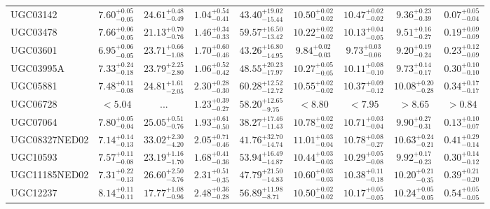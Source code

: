 \documentclass[onecolumn]{mn2e}
\begin{document}
{\begin{center}
\begin{longtable}{lcccccccc}
UGC03142 & $7.60_{-0.05}^{+0.05}$ & $24.61_{-0.49}^{+0.48}$ & $1.04_{-0.41}^{+0.54}$ &$43.40_{-15.44}^{+19.02}$ & $10.50_{-0.02}^{+0.02}$ & $10.47_{-0.02}^{+0.02}$ & $9.36_{-0.39}^{+0.23}$ & $0.07_{-0.04}^{+0.05}$ \\
UGC03478 & $7.66_{-0.05}^{+0.06}$ & $21.13_{-0.76}^{+0.70}$ & $1.46_{-0.33}^{+0.34}$ &$59.57_{-13.42}^{+16.50}$ & $10.22_{-0.02}^{+0.02}$ & $10.13_{-0.05}^{+0.04}$ & $9.51_{-0.27}^{+0.16}$ & $0.19_{-0.09}^{+0.09}$ \\
UGC03601 & $6.95_{-0.05}^{+0.06}$ & $23.71_{-1.08}^{+0.66}$ & $1.70_{-0.46}^{+0.60}$ &$43.26_{-14.95}^{+16.80}$ & $9.84_{-0.03}^{+0.02}$ & $9.73_{-0.06}^{+0.03}$ & $9.20_{-0.24}^{+0.19}$ & $0.23_{-0.09}^{+0.12}$ \\
UGC03995A & $7.33_{-0.18}^{+0.24}$ & $23.79_{-2.80}^{+2.25}$ & $1.06_{-0.42}^{+0.52}$ &$48.55_{-17.97}^{+20.23}$ & $10.27_{-0.05}^{+0.05}$ & $10.11_{-0.10}^{+0.08}$ & $9.73_{-0.17}^{+0.14}$ & $0.30_{-0.10}^{+0.10}$ \\
UGC05881 & $7.48_{-0.08}^{+0.11}$ & $24.81_{-2.05}^{+1.61}$ & $2.30_{-0.30}^{+0.28}$ &$60.28_{-12.72}^{+12.52}$ & $10.55_{-0.02}^{+0.02}$ & $10.37_{-0.12}^{+0.09}$ & $10.08_{-0.28}^{+0.20}$ & $0.34_{-0.17}^{+0.17}$ \\
UGC06728 & $<5.04$ & ... & $1.23_{-0.27}^{+0.39}$ &$58.20_{-9.75}^{+12.65}$ & $<8.80$ & $<7.95$ & $>8.65$ & $>0.84$ \\
UGC07064 & $7.80_{-0.04}^{+0.05}$ & $25.05_{-0.76}^{+0.51}$ & $1.93_{-0.50}^{+0.61}$ &$38.27_{-11.43}^{+17.46}$ & $10.78_{-0.02}^{+0.02}$ & $10.71_{-0.04}^{+0.03}$ & $9.90_{-0.31}^{+0.27}$ & $0.13_{-0.07}^{+0.10}$ \\
UGC08327NED02 & $7.14_{-0.13}^{+0.14}$ & $33.02_{-4.20}^{+2.30}$ & $2.05_{-0.46}^{+0.71}$ &$41.76_{-14.74}^{+32.70}$ & $11.01_{-0.04}^{+0.03}$ & $10.78_{-0.27}^{+0.08}$ & $10.63_{-0.21}^{+0.24}$ & $0.41_{-0.14}^{+0.29}$ \\
UGC10593 & $7.57_{-0.08}^{+0.11}$ & $23.19_{-1.70}^{+1.16}$ & $1.68_{-0.36}^{+0.41}$ &$53.94_{-14.87}^{+16.49}$ & $10.44_{-0.03}^{+0.03}$ & $10.29_{-0.08}^{+0.05}$ & $9.92_{-0.23}^{+0.17}$ & $0.30_{-0.12}^{+0.14}$ \\
UGC11185NED02 & $7.31_{-0.13}^{+0.22}$ & $26.60_{-3.76}^{+2.50}$ & $2.31_{-0.35}^{+0.51}$ &$47.79_{-14.83}^{+21.50}$ & $10.60_{-0.03}^{+0.03}$ & $10.38_{-0.18}^{+0.11}$ & $10.20_{-0.35}^{+0.21}$ & $0.39_{-0.20}^{+0.21}$ \\
UGC12237 & $8.14_{-0.11}^{+0.11}$ & $17.77_{-0.96}^{+1.08}$ & $2.48_{-0.28}^{+0.36}$ &$56.89_{-8.71}^{+11.98}$ & $10.50_{-0.02}^{+0.02}$ & $10.17_{-0.05}^{+0.05}$ & $10.24_{-0.05}^{+0.05}$ & $0.54_{-0.05}^{+0.05}$ \\

\end{longtable}
\end{center}}
\end{document}
